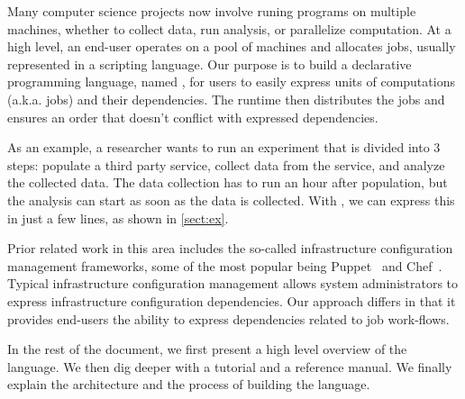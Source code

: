 
Many computer science projects now involve runing programs on multiple machines, whether to collect data, run analysis, or parallelize computation.
At a high level, an end-user operates on a pool of machines and allocates jobs, usually represented in a scripting language.
Our purpose is to build a declarative programming language, named \lang{}, for users to easily express units of computations (a.k.a. jobs) and their dependencies.
The runtime then distributes the jobs and ensures an order that doesn't conflict with expressed dependencies.

As an example, a researcher wants to run an experiment that is divided into 3 steps: populate a third party service, collect data from the service, and analyze the collected data.
The data collection has to run an hour after population, but the analysis can start as soon as the data is collected.
With \lang{}, we can express this in just a few lines, as shown in \ref{sect:ex}.

Prior related work in this area includes the so-called infrastructure
configuration management frameworks, some of the most popular being
Puppet~\cite{puppet} and Chef~\cite{chef}. Typical infrastructure
configuration management allows system administrators to express
infrastructure configuration dependencies. Our approach differs in that
it provides end-users the ability to express dependencies related to
job work-flows.

In the rest of the document, we first present a high level overview of the language.
We then dig deeper with a tutorial and a reference manual.
We finally explain the architecture and the process of building the language.

